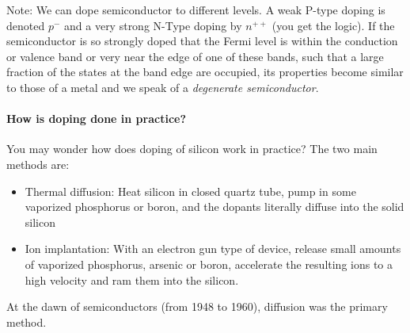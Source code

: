 Note: We can dope semiconductor to different levels. A weak P-type doping is denoted $p^-$ and a very strong N-Type doping by $n^{++}$ (you get the logic). If the semiconductor is so strongly doped that the Fermi level is within the conduction or valence band or very near the edge of one of these bands, such that a large fraction of the states at the band edge are occupied, its properties become similar to those of a metal and we speak of a
\textit{degenerate semiconductor}.

\paragraph{How is doping done in practice?}
You may wonder how does doping of silicon work in practice? The two main methods are:
\begin{itemize}
    \item Thermal diffusion: Heat silicon in closed quartz tube, pump in some vaporized phosphorus or boron, and the dopants literally diffuse into the solid silicon
    \item Ion implantation: With an electron gun type of device, release small amounts of vaporized phosphorus, arsenic or boron, accelerate the resulting ions to a high velocity and ram them into the silicon.  
\end{itemize}
At the dawn of semiconductors (from 1948 to 1960), diffusion was the primary method.